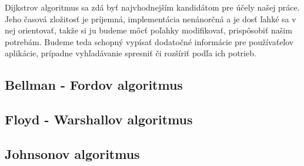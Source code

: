 Dijkstrov algoritmus sa zdá byť najvhodnejším kandidátom pre účely našej práce. Jeho časová zložitosť je príjemná, implementácia nenánorčná a je dosť ľahké sa v nej orientovať, takže si ju budeme môcť poľahky modifikovať, prispôsobiť našim potrebám. Budeme teda schopný vypísať dodatočné informácie pre používaťeľov aplikácie, prípadne vyhľadávanie spresniť či rozšíriť podľa ich potrieb.\newline

\subsection{Bellman - Fordov algoritmus}

\subsection{Floyd - Warshallov algoritmus}

\subsection{Johnsonov algoritmus}